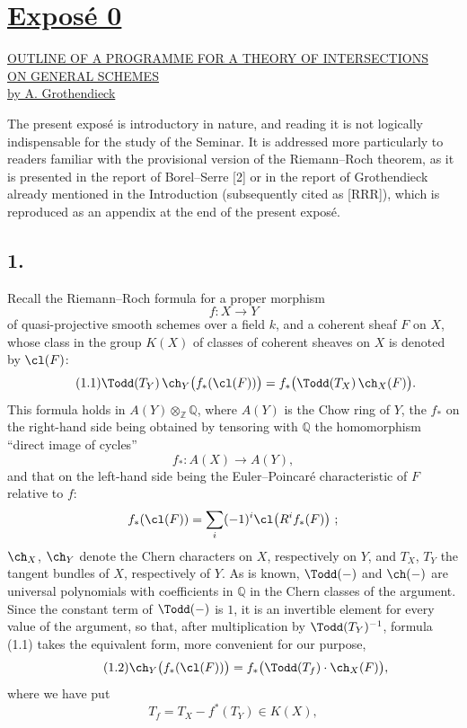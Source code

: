 \section*{\underline{Exposé 0}}
\begin{center}
\underline{\underline{OUTLINE OF A PROGRAMME FOR A THEORY OF INTERSECTIONS}}\\[3pt]
\underline{\underline{ON GENERAL SCHEMES}}\\[8pt]
\underline{by A. Grothendieck}
\end{center}

The present exposé is introductory in nature, and reading it is not logically indispensable for the study of the Seminar. It is addressed more particularly to readers familiar with the provisional version of the Riemann--Roch theorem, as it is presented in the report of Borel--Serre [2] or in the report of Grothendieck already mentioned in the Introduction (subsequently cited as [RRR]), which is reproduced as an appendix at the end of the present exposé.

\subsection*{1.}
Recall the Riemann--Roch formula for a proper morphism
\[
f:X\longrightarrow Y
\]
of quasi-projective smooth schemes over a field $k$, and a coherent sheaf $F$ on $X$, whose class in the group $K(X)$ of classes of coherent sheaves on $X$ is denoted by $\cl(F)$:
\begin{equation}\tag{1.1}
\Todd(T_Y)\,\ch_Y\bigl(f_*(\cl(F))\bigr)=f_*\bigl(\Todd(T_X)\,\ch_X(F)\bigr).
\end{equation}
This formula holds in $A(Y)\otimes_{\mathbb Z}\mathbb Q$, where $A(Y)$ is the Chow ring of $Y$, the $f_*$ on the right-hand side being obtained by tensoring with $\mathbb Q$ the homomorphism ``direct image of cycles''
\[
f_*:A(X)\longrightarrow A(Y),
\]
and that on the left-hand side being the Euler--Poincaré characteristic of $F$ relative to $f$:
\[
f_*(\cl(F))=\sum_i(-1)^i\cl\bigl(R^if_*(F)\bigr)~;
\]
$\ch_X$, $\ch_Y$ denote the Chern characters on $X$, respectively on $Y$, and $T_X$, $T_Y$ the tangent bundles of $X$, respectively of $Y$. As is known, $\Todd(-)$ and $\ch(-)$ are universal polynomials with coefficients in $\mathbb Q$ in the Chern classes of the argument. Since the constant term of $\Todd(-)$ is $1$, it is an invertible element for every value of the argument, so that, after multiplication by $\Todd(T_Y)^{-1}$, formula (1.1) takes the equivalent form, more convenient for our purpose,
\begin{equation}\tag{1.2}
\ch_Y\bigl(f_*(\cl(F))\bigr)=f_*\bigl(\Todd(T_f)\cdot\ch_X(F)\bigr),
\end{equation}
where we have put
\begin{equation}\tag{1.3}
T_f=T_X-f^*(T_Y)\in K(X),
\end{equation}

